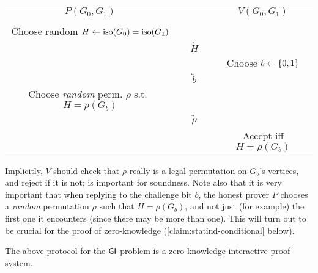 \documentclass[11pt]{article}
\begin{document}
\begin{center}
  \begin{tabular}{ccc}
    $P(G_0,G_1)$ & & $V(G_0, G_1)$ \\ \\
    Choose random $H \gets \text{iso}(G_0) = \text{iso}(G_{1})$ & & \\
    & $\underrightarrow{\quad H \quad }$ & \\
    && Choose $b \gets \{0,1\}$\\
    & $\underleftarrow{\quad b \quad}$ & \\
    Choose \emph{random} perm. $\rho$ s.t.~$H=\rho(G_b)$&& \\
    & $\underrightarrow{\quad \rho \quad}$ & \\
    && Accept iff $H=\rho(G_b)$
  \end{tabular}
\end{center}

Implicitly, $V$ should check that $\rho$ really is a legal permutation
on $G_{b}$'s vertices, and reject if it is not; is important for
soundness.  Note also that it is very important that when replying to
the challenge bit $b$, the honest prover $P$ chooses a \emph{random}
permutation $\rho$ such that $H = \rho(G_{b})$, and not just (for
example) the first one it encounters (since there may be more than
one).  This will turn out to be crucial for the proof of
zero-knowledge (\cref{claim:statind-conditional} below).

\begin{theorem}
  \label{thm:gi-zkp}
  The above protocol for the $\mathsf{GI}$ problem is a zero-knowledge
  interactive proof system.
\end{theorem}
\end{document}
